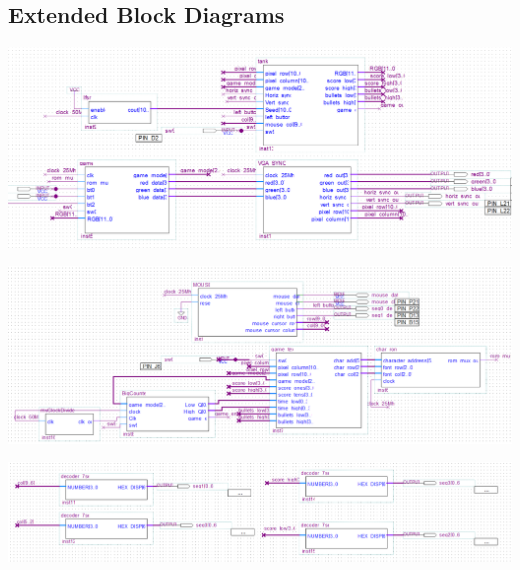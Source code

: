 \documentclass{article}
\begin{document}
\subsection{Extended Block Diagrams}

\includegraphics[width=1\textwidth]{appendix1.png}

\includegraphics[width=1\textwidth]{appendix2.png}

\includegraphics[width=1\textwidth]{appendix3.png}
\end{document}
